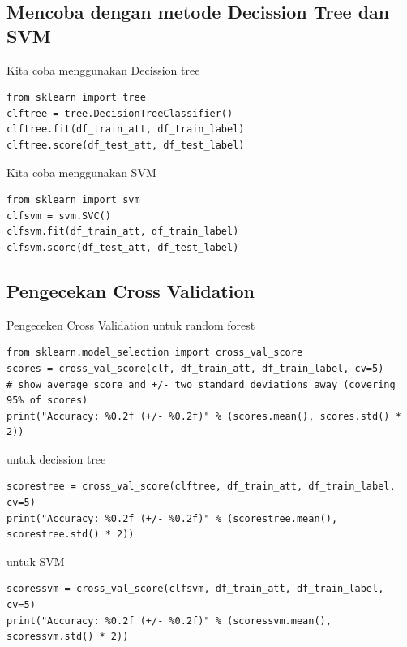 \subsection{Mencoba dengan metode Decission Tree dan SVM}
Kita coba menggunakan Decission tree
\begin{lstlisting}[caption=Mencoba klasifikasi dengan decission tree dengan dataset yang sama,label={lst:3.19}]
from sklearn import tree
clftree = tree.DecisionTreeClassifier()
clftree.fit(df_train_att, df_train_label)
clftree.score(df_test_att, df_test_label)
\end{lstlisting}
Kita coba menggunakan SVM
\begin{lstlisting}[caption=Mencoba klasifikasi dengan SVM dengan dataset yang sama,label={lst:3.20}]
from sklearn import svm
clfsvm = svm.SVC()
clfsvm.fit(df_train_att, df_train_label)
clfsvm.score(df_test_att, df_test_label)
\end{lstlisting}

\subsection{Pengecekan Cross Validation}
Pengeceken Cross Validation untuk random forest
\begin{lstlisting}[caption=Hasil Cross Validation random forest,label={lst:3.21}]
from sklearn.model_selection import cross_val_score
scores = cross_val_score(clf, df_train_att, df_train_label, cv=5)
# show average score and +/- two standard deviations away (covering 95% of scores)
print("Accuracy: %0.2f (+/- %0.2f)" % (scores.mean(), scores.std() * 2))
\end{lstlisting}
untuk decission tree
\begin{lstlisting}[caption=Hasil Cross Validation Decission Tree,label={lst:3.22}]
scorestree = cross_val_score(clftree, df_train_att, df_train_label, cv=5)
print("Accuracy: %0.2f (+/- %0.2f)" % (scorestree.mean(), scorestree.std() * 2))
\end{lstlisting}
untuk SVM
\begin{lstlisting}[caption=Hasil Cross Validation SVM,label={lst:3.23}]
scoressvm = cross_val_score(clfsvm, df_train_att, df_train_label, cv=5)
print("Accuracy: %0.2f (+/- %0.2f)" % (scoressvm.mean(), scoressvm.std() * 2))
\end{lstlisting}




